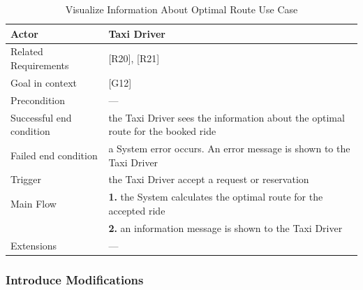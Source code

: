 \begin{table}[htbp]
\begin{center}
\begin{tabular}[t]{p{}p{}}

\hline
Actor & Taxi Driver \\
\hline
Related Requirements & [R20], [R21] \\
\hline
Goal in context & [G12] \\
\hline
Precondition & --- \\
\hline
Successful end condition & the Taxi Driver sees the information about the optimal route for the booked ride \\
\hline
Failed end condition & a System error occurs. An error message is shown to the Taxi Driver  \\
\hline
Trigger & the Taxi Driver accept a request or reservation \\
\hline
Main Flow & \textbf{1.} the System calculates the optimal route for the accepted ride \\
& \textbf{2.} an information message is shown to the Taxi Driver \\
\hline
Extensions & --- \\
\hline

\end{tabular}
\end{center}
\caption{Visualize Information About Optimal Route Use Case}
\end{table}
\clearpage

\subsubsection{Introduce Modifications}

